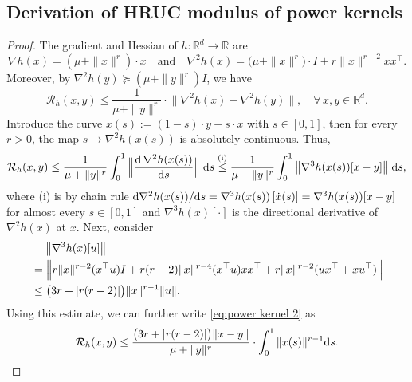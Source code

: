 \documentclass{article}
\theoremstyle{plain}
\theoremstyle{definition}
\theoremstyle{remark}
\newcommand{\R}{\mathbb{R}}
\newcommand{\Rd}{\mathbb{R}^d}
\newcommand{\cR}{\mathcal{R}}
\begin{document}
\subsection{Derivation of HRUC modulus of power kernels}\label{appendix:power kernel}
\begin{proof}
The gradient and Hessian of $h:\Rd\to\R$ are
\[
\nabla h(x)= (\mu+\|x\|^r)\cdot x \quad \text{and} \quad \nabla^2 h(x)= \big(\mu+\|x\|^r\big) \cdot  I + r\|x\|^{r-2}xx^\top.
\]
Moreover, by $\nabla^2 h(y) \succeq (\mu+\|y\|^r) I$, we have
\[   \cR_h(x,y)  \leq \frac{1}{\mu+\|y\|^r}\cdot \big\|\nabla^2 h(x) - \nabla^2 h(y)\big\|,\quad \forall\,x,y\in\Rd.
\]
Introduce the curve $x(s):=(1-s)\cdot y + s \cdot x$ with $s\in[0,1]$, then
for every $r>0$, the map $s\mapsto\nabla^2h(x(s))$ is absolutely continuous. Thus,
\begin{equation}\label{eq:power kernel 2}
    \cR_h(x,y)  \leq \frac{1}{\mu+\|y\|^r} \int_0^1\Big\|\frac{{\rm d}\, \nabla^2 h(x(s))}{{\rm d}s}\Big\|\;{\rm d}s \overset{\text{(i)}}{\leq} \frac{1}{\mu+\|y\|^r} \int_0^1\big\|\nabla^3 h(x(s)) [x-y] \big\|\;{\rm d}s,
\end{equation}
where (i) is by chain rule ${\rm d} \nabla^2 h(x(s))/{\rm d}s = \nabla^3 h(x(s)) \,[\dot x(s)] = \nabla^3 h(x(s)) [x-y]$ for almost every $s\in[0,1]$
and $\nabla^3 h(x)[\cdot]$ is the directional derivative of $\nabla^2 h(x)$ at $x$. Next, consider
\begin{equation*}
\begin{aligned}
&\hspace{4.5mm}\big\|\nabla^3 h(x)[u] \big\| \\ &= \Big\| r\|x\|^{r-2}(x^\top u)I + r(r-2)\|x\|^{r-4}(x^\top u) xx^\top + r\|x\|^{r-2}(ux^\top + x u^\top)\Big\|    \\
&\leq \big(3r+|r(r-2)|\big)\|x\|^{r-1} \|u\|.
\end{aligned} \end{equation*}
Using this estimate, we can further write \eqref{eq:power kernel 2} as
\begin{equation}\label{eq:power kernel 3}
    \cR_h(x,y)  \leq \frac{\big(3r+|r(r-2)|\big)\|x-y\|}{\mu+\|y\|^r} \cdot \int_{0}^1 \|x(s)\|^{r-1} {\rm d}s.

\end{equation}
\end{proof}
\end{document}
